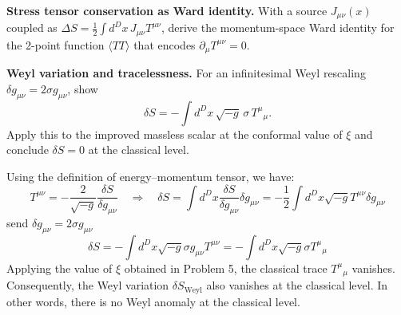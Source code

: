 \begin{problem}
    \textbf{Stress tensor conservation as Ward identity.} With a source \(J_{\mu\nu}(x)\) coupled as \(\Delta S=\frac{1}{2}\int d^Dx\,J_{\mu\nu}T^{\mu\nu}\), derive the momentum-space Ward identity for the 2-point function \(\langle TT\rangle\) that encodes \(\partial_\mu T^{\mu\nu}=0\).
\end{problem}
\begin{problem}
    \textbf{Weyl variation and tracelessness.} For an infinitesimal Weyl rescaling \(\delta g_{\mu\nu}=2\sigma g_{\mu\nu}\), show
    \[
        \delta S=-\int d^Dx\,\sqrt{-g}\,\sigma\,T^\mu{}_\mu.
    \]
    Apply this to the improved massless scalar at the conformal value of \(\xi\) and conclude \(\delta S=0\) at the classical level.
\end{problem}
\begin{solution}[25.7]
	Using the definition of energy--momentum tensor, we have:
	\[
	T^{\mu\nu}=-\frac{2}{\sqrt{-g}}\frac{\delta S}{\delta g_{\mu\nu}}\quad\Rightarrow\quad\delta S=\int d^Dx\frac{\delta S}{\delta g_{\mu\nu}}\delta g_{\mu\nu}=-\frac{1}{2}\int d^Dx\sqrt{-g}T^{\mu\nu}\delta g_{\mu\nu}
	\]
	send $\delta g_{\mu\nu}=2\sigma g_{\mu\nu}$
	\[
	\delta S=-\int d^Dx\sqrt{-g}\sigma g_{\mu\nu}T^{\mu\nu}=-\int d^Dx\sqrt{-g}\sigma T^\mu{}_\mu
	\]
	Applying the value of $\xi$ obtained in Problem 5, the classical trace ${T^{\mu}}_{\mu}$ vanishes. Consequently, the Weyl variation $\delta S_{\text{Weyl}}$ also vanishes at the classical level. In other words, there is no Weyl anomaly at the classical level.
\end{solution}
